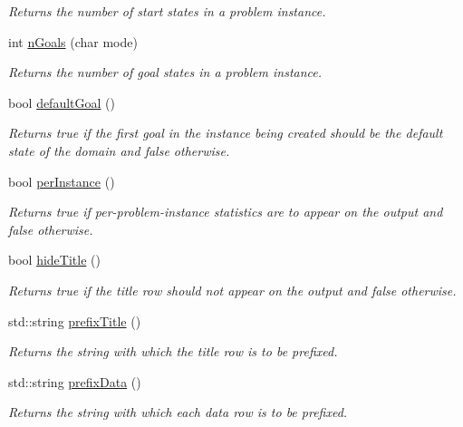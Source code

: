 \begin{DoxyCompactItemize}
\begin{DoxyCompactList}\small\item\em Returns the number of start states in a problem instance. \end{DoxyCompactList}\item 
int \hyperlink{structslb_1_1core_1_1commandLine_1_1CommandLine_a062e26ee110941ffbe598f13313b758c}{n\+Goals} (char mode)
\begin{DoxyCompactList}\small\item\em Returns the number of goal states in a problem instance. \end{DoxyCompactList}\item 
bool \hyperlink{structslb_1_1core_1_1commandLine_1_1CommandLine_a8f2cd242e85739a4aef2733755811fa7}{default\+Goal} ()
\begin{DoxyCompactList}\small\item\em Returns {\ttfamily true} if the first goal in the instance being created should be the default state of the domain and {\ttfamily false} otherwise. \end{DoxyCompactList}\item 
bool \hyperlink{structslb_1_1core_1_1commandLine_1_1CommandLine_aba20650577b010f9699c127e258821c3}{per\+Instance} ()
\begin{DoxyCompactList}\small\item\em Returns {\ttfamily true} if per-\/problem-\/instance statistics are to appear on the output and {\ttfamily false} otherwise. \end{DoxyCompactList}\item 
bool \hyperlink{structslb_1_1core_1_1commandLine_1_1CommandLine_a49a9a1dc9794bbabde1247dfdf056823}{hide\+Title} ()
\begin{DoxyCompactList}\small\item\em Returns {\ttfamily true} if the title row should not appear on the output and {\ttfamily false} otherwise. \end{DoxyCompactList}\item 
std\+::string \hyperlink{structslb_1_1core_1_1commandLine_1_1CommandLine_aea4d54aee80abe312965b0508751b925}{prefix\+Title} ()
\begin{DoxyCompactList}\small\item\em Returns the string with which the title row is to be prefixed. \end{DoxyCompactList}\item 
std\+::string \hyperlink{structslb_1_1core_1_1commandLine_1_1CommandLine_a0fde6d0c2ba0719bb6dacaab612c872b}{prefix\+Data} ()
\begin{DoxyCompactList}\small\item\em Returns the string with which each data row is to be prefixed. \end{DoxyCompactList}\end{DoxyCompactItemize}
